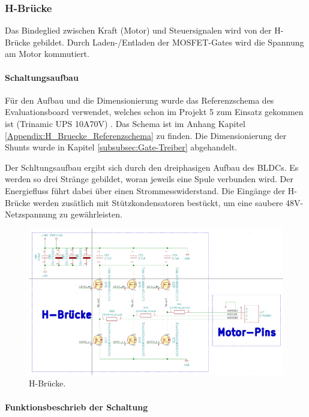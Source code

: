 \subsubsection{H-Brücke}
\label{subsubsec:H-Brücke}

Das Bindeglied zwischen Kraft (Motor) und Steuersignalen wird von der H-Brücke gebildet. Durch Laden-/Entladen der MOSFET-Gates wird die Spannung am Motor kommutiert.

\paragraph{Schaltungsaufbau}\mbox{}

Für den Aufbau und die Dimensionierung wurde das Referenzschema des Evaluationsboard verwendet, welches schon im Projekt 5 zum Einsatz gekommen ist (Trinamic UPS 10A70V) \cite{trinamicmotion_control_gmbh__co_kg_tmc-ups-xaxv-eval_2017}.  Das Schema ist im Anhang Kapitel \ref{Appendix:H_Bruecke_Referenzschema} zu finden. Die Dimensionierung der Shunts wurde in Kapitel \ref{subsubsec:Gate-Treiber} abgehandelt.

Der Schltungsaufbau ergibt sich durch den dreiphasigen Aufbau des BLDCs. Es werden so drei Stränge gebildet, woran jeweils eine Spule verbunden wird. Der Energiefluss führt dabei über einen Strommesswiderstand. Die Eingänge der H-Brücke werden zusätlich mit Stützkondensatoren bestückt, um eine saubere 48V-Netzspannung zu gewährleisten.

\begin{figure}[H]
	\centering
	\includegraphics[width=\textwidth]{graphics/Schema_H_Bruecke_und_BLDC}
	\caption{H-Brücke.}
	\label{fig:Schema_H_Bruecke_und_BLDC}
\end{figure}

\paragraph{Funktionsbeschrieb der Schaltung}\mbox{}

